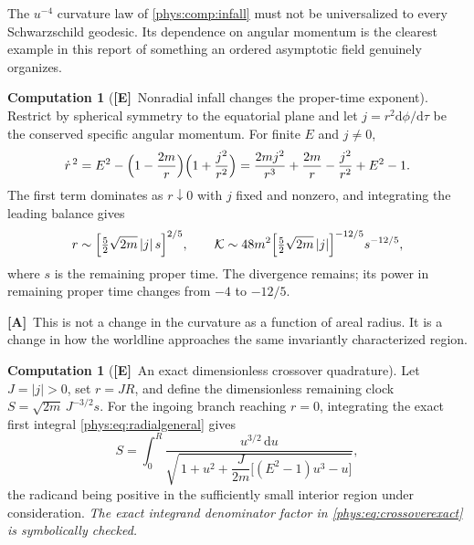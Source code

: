 \documentclass[11pt,letterpaper]{article}
\numberwithin{equation}{section}
\theoremstyle{definition}
\newtheorem{computation}[theorem]{Computation}
\theoremstyle{remark}
\newcommand{\Kret}{\mathcal K}
\newcommand{\dd}{\mathrm d}
\newcommand{\abs}[1]{\lvert#1\rvert}
\newcommand{\TE}{\textcolor{TierE}{\textsf{\bfseries[E]}}}
\newcommand{\TA}{\textcolor{TierA}{\textsf{\bfseries[A]}}}
\begin{document}
The $u^{-4}$ curvature law of \cref{phys:comp:infall} must not be universalized
to every Schwarzschild geodesic. Its dependence on angular momentum is the
clearest example in this report of something an ordered asymptotic field
genuinely organizes.

\begin{computation}[\TE\ Nonradial infall changes the proper-time exponent]
\label{phys:comp:nonradial}
Restrict by spherical symmetry to the equatorial plane and let
$j=r^{2}\dd\phi/\dd\tau$ be the conserved specific angular momentum. For
finite $E$ and $j\ne0$,
\begin{equation}\label{phys:eq:radialgeneral}
\dot r^{\,2}=E^{2}-\Bigl(1-\frac{2m}{r}\Bigr)\Bigl(1+\frac{j^{2}}{r^{2}}\Bigr)
=\frac{2mj^{2}}{r^{3}}+\frac{2m}{r}-\frac{j^{2}}{r^{2}}+E^{2}-1.
\end{equation}
The first term dominates as $r\downarrow0$ with $j$ fixed and nonzero, and
integrating the leading balance gives
\begin{equation}\label{phys:eq:nonradial}
r\sim\Bigl[\tfrac52\sqrt{2m}\,\abs j\,s\Bigr]^{2/5},
\qquad
\Kret\sim 48m^{2}\Bigl[\tfrac52\sqrt{2m}\,\abs j\Bigr]^{-12/5}s^{-12/5},
\end{equation}
where $s$ is the remaining proper time. The divergence remains; its power in
remaining proper time changes from $-4$ to $-12/5$.
\end{computation}

\TA\ This is not a change in the curvature as a function of areal radius. It is
a change in how the worldline approaches the same invariantly characterized
region.

\begin{computation}[\TE\ An exact dimensionless crossover quadrature]
\label{phys:comp:crossover}
Let $J=\abs j>0$, set $r=JR$, and define the dimensionless remaining clock
$S=\sqrt{2m}\,J^{-3/2}s$. For the ingoing branch reaching $r=0$, integrating
the exact first integral \eqref{phys:eq:radialgeneral} gives
\begin{equation}\label{phys:eq:crossoverexact}
S=\int_{0}^{R}
\frac{u^{3/2}\,\dd u}
{\sqrt{\,1+u^{2}+\dfrac{J}{2m}\bigl[(E^{2}-1)u^{3}-u\bigr]}},
\end{equation}
the radicand being positive in the sufficiently small interior region under
consideration. \emph{The exact integrand denominator factor in
\eqref{phys:eq:crossoverexact} is symbolically checked.}
\end{computation}
\end{document}
